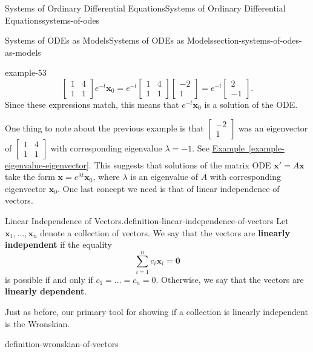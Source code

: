 \documentclass[oneside,10pt,]{book}
\newcommand{\terminology}[1]{\textbf{#1}}
\numberwithin{equation}{section}
\renewcommand{\vec}[1]{\mathbf{#1}}
\newcommand{\amp}{&}
\begin{document}
\begin{chapterptx}{Systems of Ordinary Differential Equations}{}{Systems of Ordinary Differential Equations}{}{}{systems-of-odes}
\begin{sectionptx}{Systems of ODEs as Models}{}{Systems of ODEs as Models}{}{}{section-systems-of-odes-as-models}
\begin{example}{}{example-53}
\begin{equation*}
\begin{bmatrix}1\amp 4\\1\amp 1\end{bmatrix}e^{-t}\vec{x}_{0} = e^{-t}\begin{bmatrix}1\amp 4\\1\amp 1\end{bmatrix}\begin{bmatrix}-2\\1\end{bmatrix} = e^{-t}\begin{bmatrix}2\\-1\end{bmatrix}.
\end{equation*}
Since these expressions match, this means that \(e^{-t}\vec{x}_{0}\) is a solution of the ODE.%
\end{example}
\hypertarget{p-321}{}%
One thing to note about the previous example is that \(\begin{bmatrix}-2\\1\end{bmatrix}\) was an eigenvector of \(\begin{bmatrix}1\amp 4\\1\amp 1\end{bmatrix}\) with corresponding eigenvalue \(\lambda=-1\). See \hyperref[example-eigenvalue-eigenvector]{Example~\ref{example-eigenvalue-eigenvector}}. This suggests that solutions of the matrix ODE \(\vec{x}' = A\vec{x}\) take the form \(\vec{x} = e^{\lambda t}\vec{x}_{0}\), where \(\lambda\) is an eigenvalue of \(A\) with corresponding eigenvector \(\vec{x}_{0}\). One last concept we need is that of linear independence of vectors.%
\begin{definition}{Linear Independence of Vectors.}{definition-linear-independence-of-vectors}%
\hypertarget{p-322}{}%
Let \(\vec{x}_{1},\dots,\vec{x}_{n}\) denote a collection of vectors. We say that the vectors are \terminology{linearly independent} if the equality%
\begin{equation*}
\sum_{i=1}^{n}c_{i}\vec{x}_{i} = \vec{0}
\end{equation*}
is possible if and only if \(c_{1}=\dots=c_{n}=0\). Otherwise, we say that the vectors are \terminology{linearly dependent}.%
\end{definition}
\hypertarget{p-323}{}%
Just as before, our primary tool for showing if a collection is linearly independent is the Wronskian.%
\begin{definition}{}{definition-wronskian-of-vectors}%

\end{definition}
\end{sectionptx}
\end{chapterptx}
\end{document}
